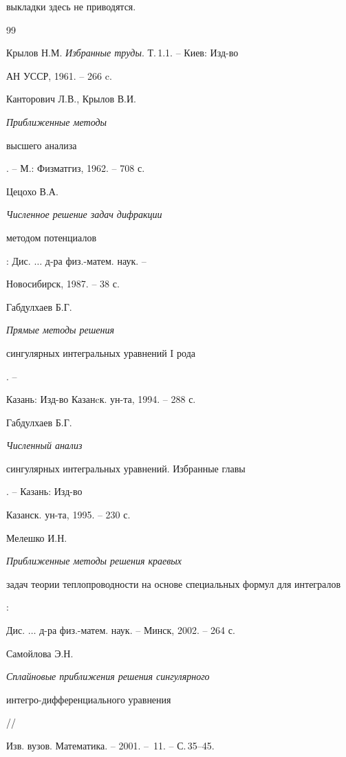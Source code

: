 выкладки здесь не приводятся.








\begin{thebibliography}{99}







Крылов Н.М. {\em Избранные труды}. Т.\,1.1. -- Киев: Изд-во


АН УССР, 1961. -- 266 c.




Канторович Л.В., Крылов В.И. {\em Приближенные методы


высшего анализа}. -- М.: Физматгиз, 1962. -- 708 с.




Цецохо В.А. {\em Численное решение задач дифракции


методом потенциалов}: Дис. $\dotsc$ д-ра физ.-матем. наук. -- 


Новосибирск, 1987. -- 38 с.




Габдулхаев Б.Г. {\em Прямые методы решения


сингулярных интегральных уравнений $\mathrm I$ рода}. --


Казань: Изд-во Казанcк. ун-та, 1994. -- 288 с.




Габдулхаев Б.Г. {\em Численный анализ


сингулярных интегральных уравнений. Избранные главы}. -- Казань: Изд-во


Казанск. ун-та, 1995. -- 230 с.




Мелешко И.Н. {\em Приближенные методы решения краевых


задач теории теплопроводности на основе специальных формул для интегралов}:


Дис. $\dotsc$ д-ра физ.-матем. наук. -- Минск, 2002. -- 264 с.




Самойлова Э.Н. {\em Сплайновые приближения решения сингулярного 


интегро-диф\-фе\-рен\-ци\-аль\-но\-го уравнения} //


Изв. вузов. Математика. -- 2001. -- \No\,11. -- С.\,35--45.





\end{thebibliography}

